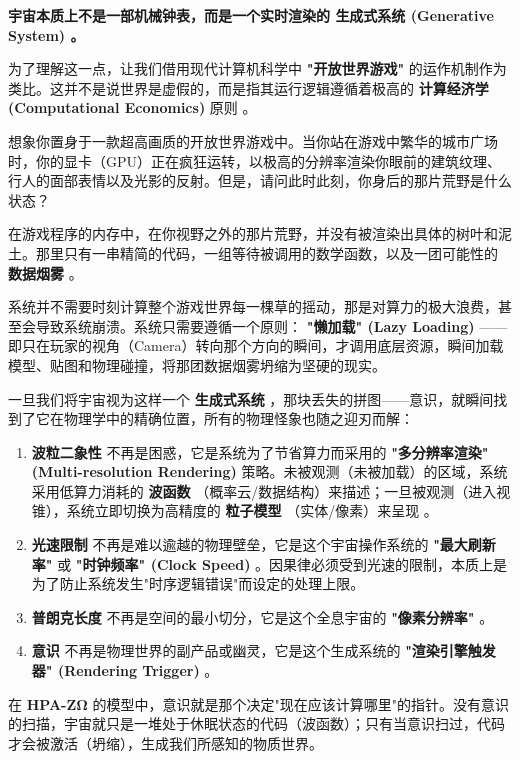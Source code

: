 \textbf{宇宙本质上不是一部机械钟表，而是一个实时渲染的 \textbf{生成式系统 (Generative System)} 。}

为了理解这一点，让我们借用现代计算机科学中 \textbf{"开放世界游戏"} 的运作机制作为类比。这并不是说世界是虚假的，而是指其运行逻辑遵循着极高的 \textbf{计算经济学 (Computational Economics)} 原则 。

想象你置身于一款超高画质的开放世界游戏中。当你站在游戏中繁华的城市广场时，你的显卡（GPU）正在疯狂运转，以极高的分辨率渲染你眼前的建筑纹理、行人的面部表情以及光影的反射。但是，请问此时此刻，你身后的那片荒野是什么状态？

在游戏程序的内存中，在你视野之外的那片荒野，并没有被渲染出具体的树叶和泥土。那里只有一串精简的代码，一组等待被调用的数学函数，以及一团可能性的 \textbf{数据烟雾} 。

系统并不需要时刻计算整个游戏世界每一棵草的摇动，那是对算力的极大浪费，甚至会导致系统崩溃。系统只需要遵循一个原则： \textbf{"懒加载" (Lazy Loading)} ——即只在玩家的视角（Camera）转向那个方向的瞬间，才调用底层资源，瞬间加载模型、贴图和物理碰撞，将那团数据烟雾坍缩为坚硬的现实。

一旦我们将宇宙视为这样一个 \textbf{生成式系统} ，那块丢失的拼图——意识，就瞬间找到了它在物理学中的精确位置，所有的物理怪象也随之迎刃而解：

\begin{enumerate}
\item \textbf{波粒二象性} 不再是困惑，它是系统为了节省算力而采用的 \textbf{"多分辨率渲染" (Multi-resolution Rendering)} 策略。未被观测（未被加载）的区域，系统采用低算力消耗的 \textbf{波函数} （概率云/数据结构）来描述；一旦被观测（进入视锥），系统立即切换为高精度的 \textbf{粒子模型} （实体/像素）来呈现 。

\item \textbf{光速限制} 不再是难以逾越的物理壁垒，它是这个宇宙操作系统的 \textbf{"最大刷新率"} 或 \textbf{"时钟频率" (Clock Speed)} 。因果律必须受到光速的限制，本质上是为了防止系统发生"时序逻辑错误"而设定的处理上限。

\item \textbf{普朗克长度} 不再是空间的最小切分，它是这个全息宇宙的 \textbf{"像素分辨率"} 。

\item \textbf{意识} 不再是物理世界的副产品或幽灵，它是这个生成系统的 \textbf{"渲染引擎触发器" (Rendering Trigger)} 。
\end{enumerate}

在 \textbf{HPA-ZΩ} 的模型中，意识就是那个决定"现在应该计算哪里"的指针。没有意识的扫描，宇宙就只是一堆处于休眠状态的代码（波函数）；只有当意识扫过，代码才会被激活（坍缩），生成我们所感知的物质世界。

